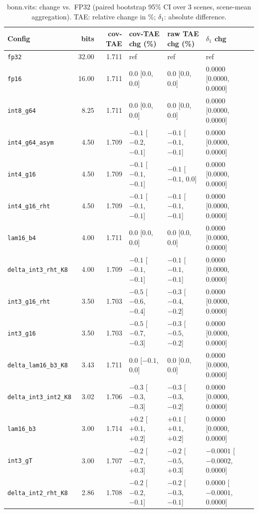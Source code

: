 \begin{table}[t]
\centering
\small
\caption{bonn.vits: change vs.\ FP32 (paired bootstrap 95\% CI over 3 scenes, scene-mean aggregation). TAE: relative change in \%; $\delta_1$: absolute difference.}
\label{tab:boot_bonn_vits_sm}
\begin{tabular}{lrrlll}
\toprule
Config & bits & cov-TAE & cov-TAE chg (\%) & raw TAE chg (\%) & $\delta_1$ chg \\
\midrule
\texttt{fp32} & 32.00 & 1.711 & ref & ref & ref \\
\texttt{fp16} & 16.00 & 1.711 & 0.0 [0.0, 0.0] & 0.0 [0.0, 0.0] & 0.0000 [0.0000, 0.0000] \\
\texttt{int8\_g64} & 8.25 & 1.711 & 0.0 [0.0, 0.0] & 0.0 [0.0, 0.0] & 0.0000 [0.0000, 0.0000] \\
\texttt{int4\_g64\_asym} & 4.50 & 1.709 & $-0.1$ [$-0.2$, $-0.1$] & $-0.1$ [$-0.1$, $-0.1$] & 0.0000 [0.0000, 0.0000] \\
\texttt{int4\_g16} & 4.50 & 1.709 & $-0.1$ [$-0.1$, $-0.1$] & $-0.1$ [$-0.1$, 0.0] & 0.0000 [0.0000, 0.0000] \\
\texttt{int4\_g16\_rht} & 4.50 & 1.709 & $-0.1$ [$-0.1$, $-0.1$] & $-0.1$ [$-0.1$, $-0.1$] & 0.0000 [0.0000, 0.0000] \\
\texttt{lam16\_b4} & 4.00 & 1.711 & 0.0 [0.0, 0.0] & 0.0 [0.0, 0.0] & 0.0000 [0.0000, 0.0000] \\
\texttt{delta\_int3\_rht\_K8} & 4.00 & 1.709 & $-0.1$ [$-0.1$, $-0.1$] & $-0.1$ [$-0.1$, $-0.1$] & 0.0000 [0.0000, 0.0000] \\
\texttt{int3\_g16\_rht} & 3.50 & 1.703 & $-0.5$ [$-0.6$, $-0.4$] & $-0.3$ [$-0.4$, $-0.2$] & 0.0000 [0.0000, 0.0000] \\
\texttt{int3\_g16} & 3.50 & 1.703 & $-0.5$ [$-0.7$, $-0.3$] & $-0.3$ [$-0.5$, $-0.2$] & 0.0000 [0.0000, 0.0000] \\
\texttt{delta\_lam16\_b3\_K8} & 3.43 & 1.711 & 0.0 [$-0.1$, 0.0] & 0.0 [0.0, 0.0] & 0.0000 [0.0000, 0.0000] \\
\texttt{delta\_int3\_int2\_K8} & 3.02 & 1.706 & $-0.3$ [$-0.3$, $-0.3$] & $-0.3$ [$-0.3$, $-0.2$] & 0.0000 [0.0000, 0.0000] \\
\texttt{lam16\_b3} & 3.00 & 1.714 & $+0.2$ [$+0.1$, $+0.2$] & $+0.1$ [$+0.1$, $+0.2$] & 0.0000 [0.0000, 0.0000] \\
\texttt{int3\_gT} & 3.00 & 1.707 & $-0.2$ [$-0.7$, $+0.3$] & $-0.2$ [$-0.5$, $+0.3$] & $-0.0001$ [$-0.0002$, 0.0000] \\
\texttt{delta\_int2\_rht\_K8} & 2.86 & 1.708 & $-0.2$ [$-0.2$, $-0.1$] & $-0.2$ [$-0.3$, $-0.1$] & 0.0000 [$-0.0001$, 0.0000] \\

\end{tabular}
\end{table}
